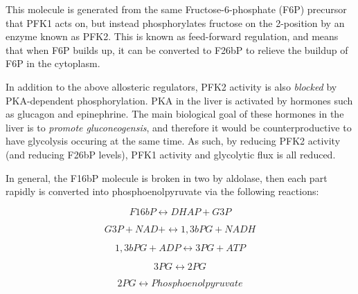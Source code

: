 \documentclass{tufte-handout}
\begin{document}
  This molecule is generated from the same Fructose-6-phosphate (F6P) precursor that PFK1 acts on, but instead phosphorylates fructose on the 2-position by an enzyme known as PFK2.  This is known as feed-forward regulation, and means that when F6P builds up, it can be converted to F26bP to relieve the buildup of F6P in the cytoplasm.

  In addition to the above allosteric regulators, PFK2 activity is also \emph{blocked} by PKA-dependent phosphorylation.  PKA in the liver is activated by hormones such as glucagon and epinephrine.  The main biological goal of these hormones in the liver is to \emph{promote gluconeogensis}, and therefore it would be counterproductive to have glycolysis occuring at the same time.  As such, by reducing PFK2 activity (and reducing F26bP levels), PFK1 activity and glycolytic flux is all reduced.

  In general, the F16bP molecule is broken in two by aldolase, then each part rapidly is converted into phosphoenolpyruvate via the following reactions:

\begin{equation}
F16bP \leftrightarrow DHAP+ G3P
\end{equation}

\begin{equation}
G3P + NAD+ \leftrightarrow 1,3bPG  + NADH
\end{equation}

\begin{equation}
1,3bPG + ADP \leftrightarrow 3PG + ATP
\end{equation}

\begin{equation}
3PG \leftrightarrow 2PG
\end{equation}

\begin{equation}
2PG \leftrightarrow Phosphoenolpyruvate
\end{equation}
\end{document}
